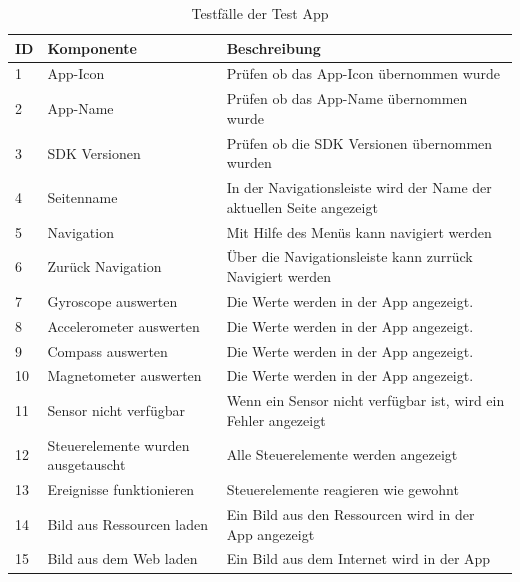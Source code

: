 \begin{table}[!ht]
\begin{tabularx}{\textwidth}{l|l|X}
   \textbf{ID} & \textbf{Komponente} & \textbf{Beschreibung} \\
\hline
1             & App-Icon           	& Prüfen ob das App-Icon übernommen wurde                      			 \\ 
2             & App-Name          	& Prüfen ob das App-Name übernommen wurde                      		 \\ 
3             & SDK Versionen      & Prüfen ob die SDK Versionen übernommen wurden                      \\ 
4             & Seitenname           				& In der Navigationsleiste wird der Name der aktuellen Seite angezeigt                      			 \\ 
5          	  & Navigation         			  	& Mit Hilfe des Menüs kann navigiert werden                      			 \\ 
6             & Zurück Navigation           	& Über die Navigationsleiste kann zurrück Navigiert werden                      			 \\ 
7             & Gyroscope auswerten           	& Die Werte werden in der App angezeigt.                      			 \\ 
8             & Accelerometer auswerten           	& Die Werte werden in der App angezeigt.                   			 \\ 
9            & Compass auswerten           	& Die Werte werden in der App angezeigt.                			 \\ 
10            & Magnetometer auswerten           	& Die Werte werden in der App angezeigt.                			 \\ 
11            & Sensor nicht verfügbar           	& Wenn ein Sensor nicht verfügbar ist, wird ein Fehler angezeigt          			 \\ 
12            & Steuerelemente wurden ausgetauscht           	& Alle Steuerelemente werden angezeigt        			 \\ 
13            & Ereignisse funktionieren           	&  Steuerelemente reagieren wie gewohnt     			 \\ 
14            & Bild aus Ressourcen laden           	& Ein Bild aus den Ressourcen wird in der App angezeigt                      			 \\ 
15             & Bild aus dem Web laden           	& Ein Bild aus dem Internet wird in der App                      			 \\ 
\end{tabularx}
\caption{Testfälle der Test App}
 \label{tab:Testapp}
\end{table}




